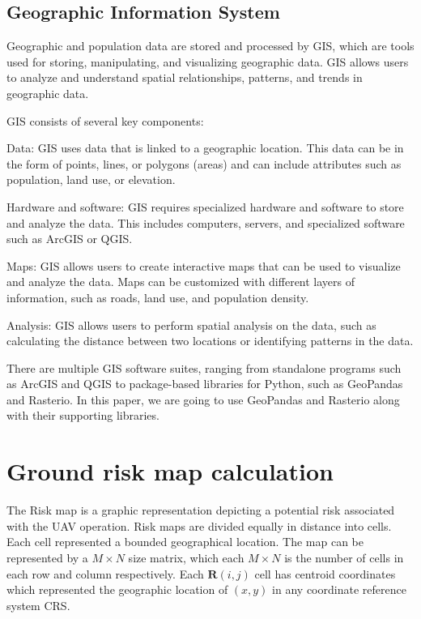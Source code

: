 \documentclass[12pt]{report}
\begin{document}
            \subsection{Geographic Information System}
            Geographic and population data are stored and processed by \ac{GIS}, which are tools used for storing,
            manipulating, and visualizing geographic data. GIS allows users to analyze and understand spatial
            relationships, patterns, and trends in geographic data.
                
            GIS consists of several key components:
            \begin{myitemize}
                \item Data: GIS uses data that is linked to a geographic location. This data can be in the form of
                points, lines, or polygons (areas) and can include attributes such as population, land use, or
                elevation.
                \item Hardware and software: GIS requires specialized hardware and software to store and analyze the
                data. This includes computers, servers, and specialized software such as ArcGIS or QGIS.
                \item Maps: GIS allows users to create interactive maps that can be used to visualize and analyze the
                data. Maps can be customized with different layers of information, such as roads, land use, and
                population density.
                \item Analysis: GIS allows users to perform spatial analysis on the data, such as calculating the
                distance between two locations or identifying patterns in the data.
            \end{myitemize}
            
            There are multiple GIS software suites, ranging from standalone programs such as ArcGIS and QGIS to
            package-based libraries for Python, such as GeoPandas and Rasterio. In this paper, we are going to use
            GeoPandas and Rasterio along with their supporting libraries.

    \section{Ground risk map calculation}
        The Risk map is a graphic representation depicting a potential risk associated with the UAV operation. Risk maps
        are divided equally in distance into cells. Each cell represented a bounded geographical location. The map can
        be represented by a \(M \times N\) size matrix, which each \(M \times N\) is the number of cells in each row and
        column respectively. Each \(\mathbf{R}(i,j)\) cell has centroid coordinates which represented the geographic
        location of \((x, y)\) in any coordinate reference system \ac{CRS}.
\end{document}
